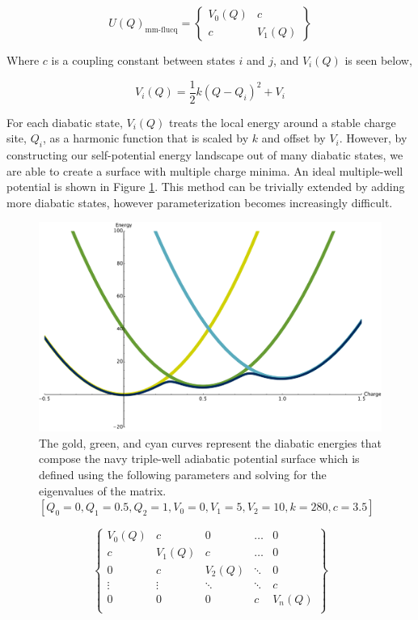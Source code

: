 \begin{equation}
U(Q)_{\text{mm-flucq}} =
\begin{Bmatrix}
 V_0(Q) & c  \\
 c   & V_1(Q)
\end{Bmatrix}
\end{equation}

Where $c$ is a coupling constant between states $i$ and $j$, and $V_i(Q)$ is
seen below,

\begin{equation*}
V_i(Q) = \frac{1}{2}k(Q - Q_i)^2 + V_i
\end{equation*}

For each diabatic state, $V_i(Q)$ treats the local energy around a stable charge
site, $Q_i$, as a harmonic function that is scaled by $k$ and offset by $V_i$.
However, by constructing our self-potential energy landscape out of many
diabatic states, we are able to create a surface with multiple charge minima.
An ideal multiple-well potential is shown in Figure \ref{fig:multipleDiabat}.
This method can be trivially extended by adding more diabatic states, however
parameterization becomes increasingly difficult.

\begin{figure}
  \centering
  \includegraphics[width=0.75\linewidth]{../figures/chap5/multipleDiabats.pdf}
  \caption{The gold, green, and cyan curves represent the diabatic energies
that compose the navy triple-well adiabatic potential surface which is defined
using the following parameters and solving for the eigenvalues of the matrix.
$[Q_0 = 0, Q_1 = 0.5, Q_2 = 1, V_0 = 0, V_1 = 5, V_2 = 10, k = 280, c = 3.5]$}
\label{fig:multipleDiabat}
\end{figure}

\begin{equation*}
  \begin{Bmatrix}
    V_0(Q) & c      & 0      & \dots  & 0\\
    c      & V_1(Q) & c      & \dots & 0\\
    0      & c      & V_2(Q) & \ddots & 0 \\
    \vdots & \vdots & \ddots & \ddots & c\\
    0      & 0      & 0      &  c     & V_n(Q) \\
    \end{Bmatrix}
\end{equation*}

